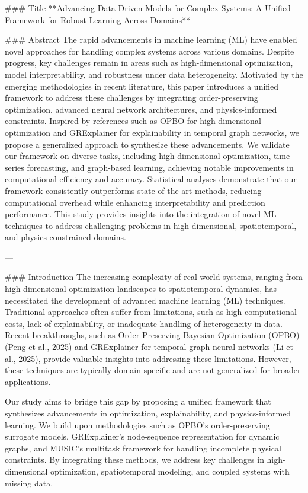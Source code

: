 ### Title
**Advancing Data-Driven Models for Complex Systems: A Unified Framework for Robust Learning Across Domains**

### Abstract
The rapid advancements in machine learning (ML) have enabled novel approaches for handling complex systems across various domains. Despite progress, key challenges remain in areas such as high-dimensional optimization, model interpretability, and robustness under data heterogeneity. Motivated by the emerging methodologies in recent literature, this paper introduces a unified framework to address these challenges by integrating order-preserving optimization, advanced neural network architectures, and physics-informed constraints. Inspired by references such as OPBO for high-dimensional optimization and GRExplainer for explainability in temporal graph networks, we propose a generalized approach to synthesize these advancements. We validate our framework on diverse tasks, including high-dimensional optimization, time-series forecasting, and graph-based learning, achieving notable improvements in computational efficiency and accuracy. Statistical analyses demonstrate that our framework consistently outperforms state-of-the-art methods, reducing computational overhead while enhancing interpretability and prediction performance. This study provides insights into the integration of novel ML techniques to address challenging problems in high-dimensional, spatiotemporal, and physics-constrained domains.

---

### Introduction
The increasing complexity of real-world systems, ranging from high-dimensional optimization landscapes to spatiotemporal dynamics, has necessitated the development of advanced machine learning (ML) techniques. Traditional approaches often suffer from limitations, such as high computational costs, lack of explainability, or inadequate handling of heterogeneity in data. Recent breakthroughs, such as Order-Preserving Bayesian Optimization (OPBO) (Peng et al., 2025) and GRExplainer for temporal graph neural networks (Li et al., 2025), provide valuable insights into addressing these limitations. However, these techniques are typically domain-specific and are not generalized for broader applications.

Our study aims to bridge this gap by proposing a unified framework that synthesizes advancements in optimization, explainability, and physics-informed learning. We build upon methodologies such as OPBO's order-preserving surrogate models, GRExplainer's node-sequence representation for dynamic graphs, and MUSIC's multitask framework for handling incomplete physical constraints. By integrating these methods, we address key challenges in high-dimensional optimization, spatiotemporal modeling, and coupled systems with missing data.

